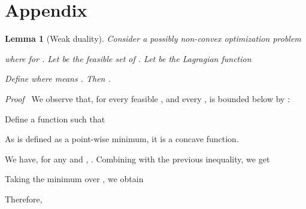 \documentclass[11pt]{article}
\newenvironment{proof}{\noindent\emph{Proof\ }}{\hspace*{\fill}\medskip}
\newtheorem{lemma}{Lemma}
\begin{document}


\newpage

\appendix

\section*{Appendix}

\setcounter{lemma}{-1}
\begin{lemma}[Weak duality]
Consider a possibly non-convex optimization problem

where  for .
Let  be the feasible set of . 
Let  be the Lagragian function

Define 
where  means . 
Then .
\end{lemma}
\begin{proof}
We observe that, for every feasible , and every ,
 is bounded below by :


Define a function  such that

As  is defined as a point-wise minimum, it is a concave function.  

We have, for any  and , . Combining with 
the previous inequality, we get 

Taking the minimum over , we obtain

Therefore,

\end{proof}
\end{document}
